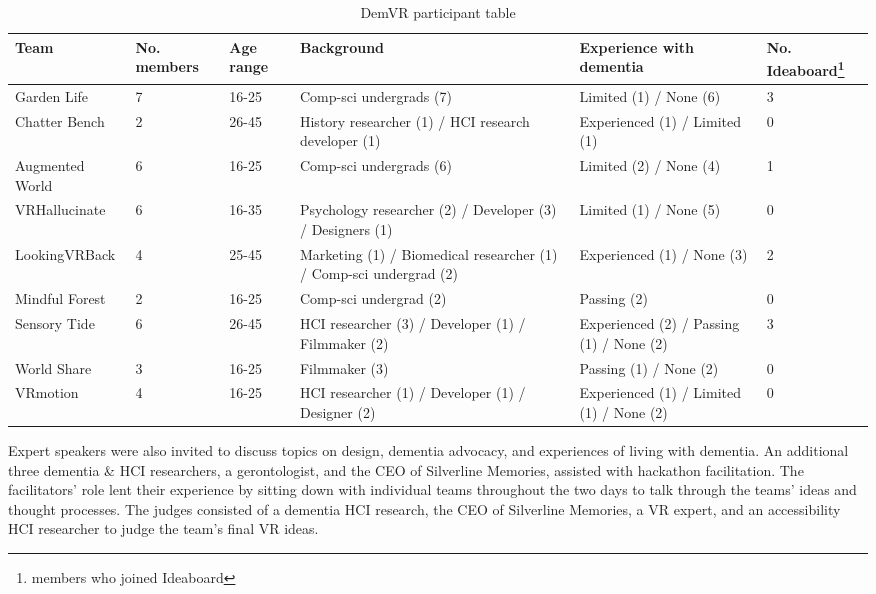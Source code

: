 \begin{table}[htp]
\begin{tabularx}{\textwidth}{@{} YYYYYY @{}}
\hline
\textbf{Team} & \textbf{No. members} & \textbf{Age range} & \textbf{Background} & \textbf{Experience with dementia} & \textbf{No. Ideaboard\footnote{members who joined Ideaboard}} \\ \hline 
Garden Life & 7 & 16-25 & Comp-sci undergrads (7) & Limited (1) / None (6) & 3 \\ \hline
Chatter Bench & 2 & 26-45 & History researcher (1) / HCI research developer   (1) & Experienced (1) / Limited (1) & 0 \\ \hline
Augmented World & 6 & 16-25 & Comp-sci undergrads (6) & Limited (2) / None (4) & 1 \\ \hline
VRHallucinate & 6 & 16-35 & Psychology researcher (2) / Developer (3) /   Designers (1) & Limited (1) / None (5) & 0 \\ \hline
LookingVRBack & 4 & 25-45 & Marketing (1) / Biomedical researcher (1) /   Comp-sci undergrad (2) & Experienced (1) / None (3) & 2 \\ \hline
Mindful Forest & 2 & 16-25 & Comp-sci undergrad (2) & Passing (2) & 0 \\ \hline
Sensory Tide & 6 & 26-45 & HCI researcher (3) / Developer (1) / Filmmaker   (2) & Experienced (2) / Passing (1) / None (2) & 3 \\ \hline
World Share & 3 & 16-25 & Filmmaker (3) & Passing (1) / None (2) & 0 \\ \hline
VRmotion & 4 & 16-25 & HCI researcher (1) / Developer (1) / Designer   (2) & Experienced (1) / Limited (1) / None (2) & 0 \\ \hline
\end{tabularx}
\caption{DemVR participant table}
\label{table:DemVRDemographic}
\end{table}

Expert speakers were also invited to discuss topics on design, dementia advocacy, and experiences of living with dementia. An additional three dementia \& HCI researchers, a gerontologist, and the CEO of Silverline Memories, assisted with hackathon facilitation. The facilitators' role lent their experience by sitting down with individual teams throughout the two days to talk through the teams' ideas and thought processes. The judges consisted of a dementia HCI research, the CEO of Silverline Memories, a VR expert, and an accessibility HCI researcher to judge the team's final VR ideas.

\pagebreak
